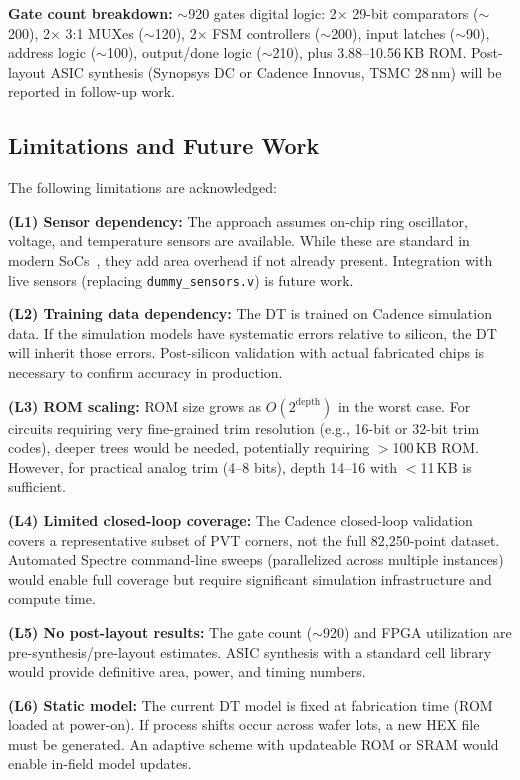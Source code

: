 \documentclass[lettersize,journal]{IEEEtran}
\begin{document}
\textbf{Gate count breakdown:} $\sim$920 gates digital logic: 2$\times$ 29-bit comparators ($\sim$200), 2$\times$ 3:1 MUXes ($\sim$120), 2$\times$ FSM controllers ($\sim$200), input latches ($\sim$90), address logic ($\sim$100), output/done logic ($\sim$210), plus 3.88--10.56\,KB ROM. Post-layout ASIC synthesis (Synopsys DC or Cadence Innovus, TSMC 28\,nm) will be reported in follow-up work.

\subsection{Limitations and Future Work}

The following limitations are acknowledged:

\textbf{(L1) Sensor dependency:} The approach assumes on-chip ring oscillator, voltage, and temperature sensors are available. While these are standard in modern SoCs~\cite{pvt_bowman}, they add area overhead if not already present. Integration with live sensors (replacing \texttt{dummy\_sensors.v}) is future work.

\textbf{(L2) Training data dependency:} The DT is trained on Cadence simulation data. If the simulation models have systematic errors relative to silicon, the DT will inherit those errors. Post-silicon validation with actual fabricated chips is necessary to confirm accuracy in production.

\textbf{(L3) ROM scaling:} ROM size grows as $O(2^{\text{depth}})$ in the worst case. For circuits requiring very fine-grained trim resolution (e.g., 16-bit or 32-bit trim codes), deeper trees would be needed, potentially requiring $>$100\,KB ROM. However, for practical analog trim (4--8 bits), depth 14--16 with $<$11\,KB is sufficient.

\textbf{(L4) Limited closed-loop coverage:} The Cadence closed-loop validation covers a representative subset of PVT corners, not the full 82,250-point dataset. Automated Spectre command-line sweeps (parallelized across multiple instances) would enable full coverage but require significant simulation infrastructure and compute time.

\textbf{(L5) No post-layout results:} The gate count ($\sim$920) and FPGA utilization are pre-synthesis/pre-layout estimates. ASIC synthesis with a standard cell library would provide definitive area, power, and timing numbers.

\textbf{(L6) Static model:} The current DT model is fixed at fabrication time (ROM loaded at power-on). If process shifts occur across wafer lots, a new HEX file must be generated. An adaptive scheme with updateable ROM or SRAM would enable in-field model updates.
\end{document}
